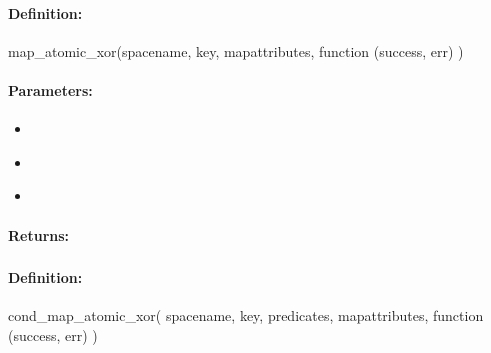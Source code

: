 \paragraph{Definition:}
\begin{javascriptcode}
map_atomic_xor(spacename, key, mapattributes, function (success, err) {})
\end{javascriptcode}
\paragraph{Parameters:}
\begin{itemize}[noitemsep]
\item {}\\

\item {}\\

\item {}\\

\end{itemize}

\paragraph{Returns:}


\pagebreak
\subsubsection{}
\label{api:nodejs:cond_map_atomic_xor}


\paragraph{Definition:}
\begin{javascriptcode}
cond_map_atomic_xor(
        spacename, key, predicates, mapattributes, function (success, err) {})
\end{javascriptcode}
